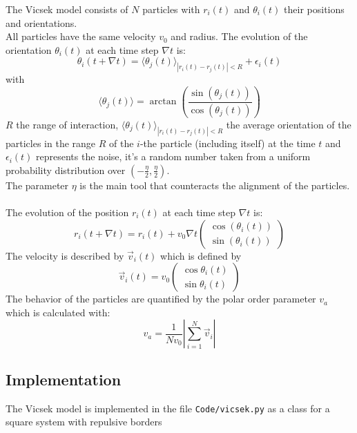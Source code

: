 \documentclass{article}
\begin{document}
The Vicsek model consists of $N$ particles with $r_i(t)$ and $\theta_i(t)$ 
their positions and orientations.\\
All particles have the same velocity $v_0$ and radius.
The evolution of the orientation $\theta_i(t)$ at each time step $\nabla t$ is:
$$\theta_i(t + \nabla t) = \langle\theta_j(t)\rangle_{|r_i(t) - r_j(t)| < R} + \epsilon_i(t)$$
with
$$\langle\theta_j(t)\rangle = \arctan\left(\frac{\sin(\theta_j(t))}{\cos(\theta_j(t))}\right)$$
$R$ the range of interaction, $\langle\theta_j(t)\rangle_{|r_i(t) - r_j(t)| < R}$ the average 
orientation of the particles in the range $R$ of
 the $i$-the particle (including itself) at the time $t$ and $\epsilon_i(t)$ represents the noise, 
 it's a random number taken from a uniform probability distribution
over $\left(-\frac{\eta}{2}, \frac{\eta}{2}\right)$.\\
The parameter $\eta$ is the main tool that counteracts the alignment of the particles.\\
\\
The evolution of the position $r_i(t)$ at each time step $\nabla t$ is:
$$ r_i(t + \nabla t) = r_i(t) + v_0\nabla t \begin{pmatrix}
    \cos(\theta_i(t))\\
    \sin(\theta_i(t))
\end{pmatrix}$$
The velocity is described by $\vec{v}_i(t)$ which is defined by
$$\vec{v}_i(t) = v_0\begin{pmatrix}
    \cos\theta_i(t)\\
    \sin\theta_i(t)
\end{pmatrix}$$
The behavior of the particles are quantified by the polar order parameter $v_a$ which is calculated with:
$$v_a = \frac{1}{Nv_0}\left|\sum^{N}_{i=1}\vec{v}_i\right|$$

\subsection{Implementation}
The Vicsek model is implemented in the file \texttt{Code/vicsek.py} as a class 
for a square system with repulsive borders
\end{document}
